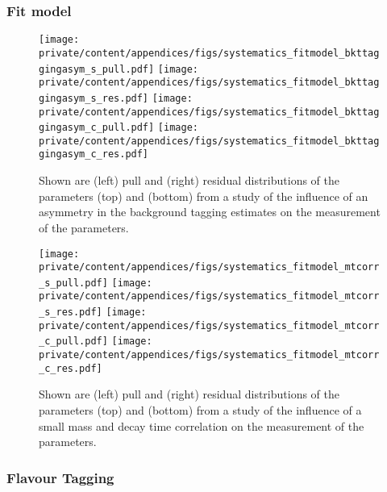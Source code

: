 \subsubsection{Fit model}
\label{sec:app:measurement_of_sin2beta:systematics:systematics:fit_model}

\begin{figure}[h]
  \texttt{[image: private/content/appendices/figs/systematics\_fitmodel\_bkttaggingasym\_s\_pull.pdf]}\hfill
  \texttt{[image: private/content/appendices/figs/systematics\_fitmodel\_bkttaggingasym\_s\_res.pdf]}
  \texttt{[image: private/content/appendices/figs/systematics\_fitmodel\_bkttaggingasym\_c\_pull.pdf]}\hfill
  \texttt{[image: private/content/appendices/figs/systematics\_fitmodel\_bkttaggingasym\_c\_res.pdf]}
\caption{Shown are (left) pull and (right) residual distributions of the
parameters (top) \SJpsiKS and (bottom) \CJpsiKS from a \ToyMC study of the
influence of an asymmetry in the background tagging estimates on the measurement
of the \CP parameters.}
\label{fig:app:measurement_of_sin2beta:systematics:systematics:fit_model:bkg_tagging_asymmetry}
\end{figure}

\begin{figure}[h]
  \texttt{[image: private/content/appendices/figs/systematics\_fitmodel\_mtcorr\_s\_pull.pdf]}\hfill
  \texttt{[image: private/content/appendices/figs/systematics\_fitmodel\_mtcorr\_s\_res.pdf]}
  \texttt{[image: private/content/appendices/figs/systematics\_fitmodel\_mtcorr\_c\_pull.pdf]}\hfill
  \texttt{[image: private/content/appendices/figs/systematics\_fitmodel\_mtcorr\_c\_res.pdf]}
\caption{Shown are (left) pull and (right) residual distributions of the
parameters (top) \SJpsiKS and (bottom) \CJpsiKS from a \ToyMC study of the
influence of a small mass and decay time correlation on the measurement of the
\CP parameters.}
\label{fig:app:measurement_of_sin2beta:systematics:systematics:fit_model:mass_time_correlations}
\end{figure}

\FloatBarrier
\subsubsection{Flavour Tagging}
\label{sec:app:measurement_of_sin2beta:systematics:systematics:tagging}

